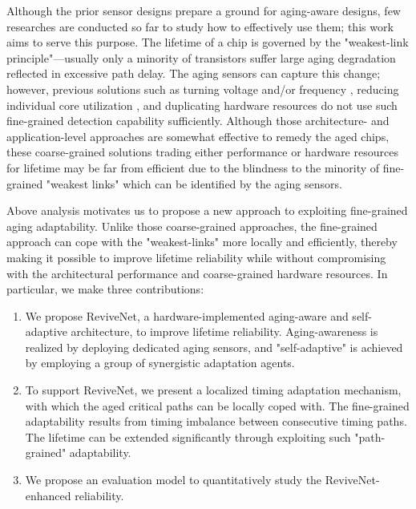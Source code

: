 Although the prior sensor designs prepare a ground for aging-aware designs, few researches are conducted so far to study how to effectively use them; this work aims to serve this purpose. The lifetime of a chip is governed by the "weakest-link principle"---usually only a minority of transistors suffer large aging degradation reflected in excessive path delay. The aging sensors can capture this change; however, previous solutions such as turning voltage and/or frequency \cite{Reliability-Aware_04}, reducing individual core utilization \cite{Facelift_08}, and duplicating hardware resources \cite{srinivasan2005exploiting}\cite{WearoutRecovery_08} do not use such fine-grained detection capability sufficiently. Although those architecture- and application-level approaches are somewhat effective to remedy the aged chips, these coarse-grained solutions trading either performance or hardware resources for lifetime may be far from efficient due to the blindness to the minority of fine-grained "weakest links" which can be identified by the aging sensors.


Above analysis motivates us to propose a new approach to exploiting fine-grained aging adaptability. Unlike those coarse-grained approaches, the fine-grained approach can cope with the "weakest-links" more locally and efficiently, thereby making it possible to improve lifetime reliability while without compromising with the architectural performance and coarse-grained hardware resources. In particular, we make three contributions:
\begin{enumerate}
\item We propose ReviveNet, a hardware-implemented aging-aware and self-adaptive architecture, to improve lifetime reliability. Aging-awareness is realized by deploying dedicated aging sensors, and "self-adaptive" is achieved by employing a group of synergistic adaptation agents.

\item To support ReviveNet, we present a localized timing adaptation mechanism, with which the aged critical paths can be locally coped with. The fine-grained adaptability results from timing imbalance between consecutive timing paths. The lifetime can be extended significantly through exploiting such "path-grained" adaptability.

\item We propose an evaluation model to quantitatively study the ReviveNet-enhanced reliability.
\end{enumerate}


